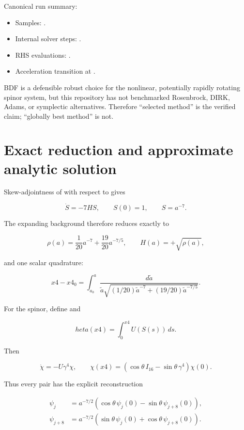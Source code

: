 \documentclass[11pt]{article}
\begin{document}
Canonical run summary:

\begin{itemize}
\item Samples: \texttt{}.
\item Internal solver steps: \texttt{}.
\item RHS evaluations: \texttt{}.
\item Acceleration transition at \texttt{}.
\end{itemize}

BDF is a defensible robust choice for the nonlinear, potentially rapidly rotating spinor system, but this repository has not benchmarked Rosenbrock, DIRK, Adams, or symplectic alternatives. Therefore ``selected method'' is the verified claim; ``globally best method'' is not.

\section{Exact reduction and approximate analytic solution}

Skew-adjointness of \texttt{} with respect to \texttt{} gives

\[
\dot S=-7HS,
\qquad S(0)=1,
\qquad \boxed{S=a^{-7}}.
\]

The expanding background therefore reduces exactly to

\[
\rho(a)=\frac1{20}a^{-7}+\frac{19}{20}a^{-7/5},
\qquad H(a)=+\sqrt{\rho(a)},
\]

and one scalar quadrature:

\[
x4-x4_0=\int_{a_0}^{a}
\frac{d\tilde a}{\tilde a\sqrt{
(1/20)\tilde a^{-7}+(19/20)\tilde a^{-7/5}}}.
\]

For the spinor, define \texttt{} and

\[
	heta(x4)=\int_0^{x4}U(S(s))\,ds.
\]

Then

\[
\dot\chi=-U\gamma^4\chi,
\qquad
\chi(x4)=\left(\cos\theta\,I_{16}
-\sin\theta\,\gamma^4\right)\chi(0).
\]

Thus every pair \texttt{} has the explicit reconstruction

\[
\begin{aligned}
\psi_j&=a^{-7/2}\left(
\cos\theta\,\psi_j(0)-\sin\theta\,\psi_{j+8}(0)\right),\\
\psi_{j+8}&=a^{-7/2}\left(
\sin\theta\,\psi_j(0)+\cos\theta\,\psi_{j+8}(0)\right).
\end{aligned}
\]
\end{document}
